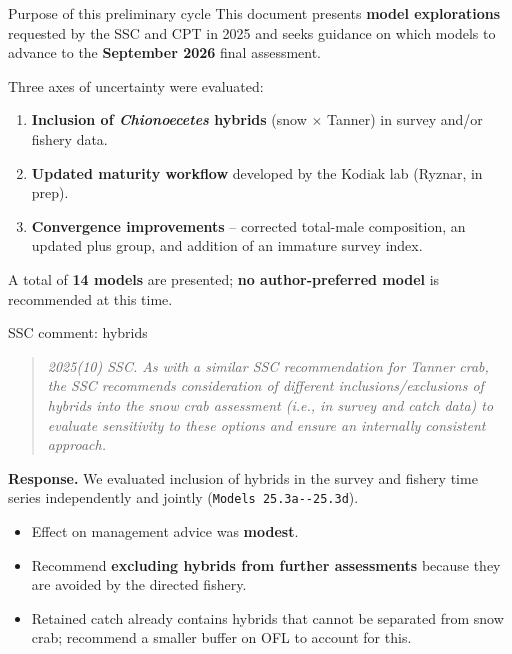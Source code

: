 \documentclass[
  10pt,
  ignorenonframetext,
  aspectratio=169,
]{beamer}
\providecommand{\tightlist}{%
  \setlength{\itemsep}{0pt}\setlength{\parskip}{0pt}}
\begin{document}
\begin{frame}{Purpose of this preliminary cycle}
\label{purpose-of-this-preliminary-cycle}
This document presents \textbf{model explorations} requested by the SSC
and CPT in 2025 and seeks guidance on which models to advance to the
\textbf{September 2026} final assessment.

\medskip

Three axes of uncertainty were evaluated:

\begin{enumerate}
\tightlist
\item
  \textbf{Inclusion of \emph{Chionoecetes} hybrids} (snow \(\times\)
  Tanner) in survey and/or fishery data.
\item
  \textbf{Updated maturity workflow} developed by the Kodiak lab
  (Ryznar, in prep).
\item
  \textbf{Convergence improvements} -- corrected total-male composition,
  an updated plus group, and addition of an immature survey index.
\end{enumerate}

\medskip

A total of \textbf{14 models} are presented; \textbf{no author-preferred
model} is recommended at this time.
\end{frame}

\begin{frame}[fragile]{SSC comment: hybrids}
\label{ssc-comment-hybrids}
\begin{quote}
\emph{2025(10) SSC. As with a similar SSC recommendation for Tanner
crab, the SSC recommends consideration of different
inclusions/exclusions of hybrids into the snow crab assessment (i.e., in
survey and catch data) to evaluate sensitivity to these options and
ensure an internally consistent approach.}
\end{quote}

\medskip

\textbf{Response.} We evaluated inclusion of hybrids in the survey and
fishery time series independently and jointly
(\texttt{Models\ 25.3a-\/-25.3d}).

\medskip

\begin{itemize}
\tightlist
\item
  Effect on management advice was \textbf{modest}.
\item
  Recommend \textbf{excluding hybrids from further assessments} because
  they are avoided by the directed fishery.
\item
  Retained catch already contains hybrids that cannot be separated from
  snow crab; recommend a smaller buffer on OFL to account for this.
\end{itemize}
\end{frame}
\end{document}
